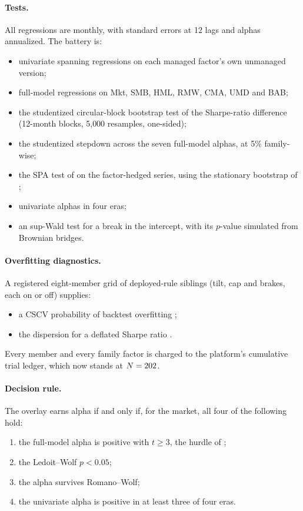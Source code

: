 \documentclass[11pt]{article}
\begin{document}
\paragraph{Tests.} All regressions are monthly, with \citet{newey1987}
standard errors at 12 lags and alphas annualized. The battery is:
\begin{itemize}
\item univariate spanning regressions on each managed factor's own unmanaged
  version;
\item full-model regressions on Mkt, SMB, HML, RMW, CMA, UMD and BAB;
\item the \citet{ledoit2008} studentized circular-block bootstrap test of the
  Sharpe-ratio difference (12-month blocks, 5{,}000 resamples, one-sided);
\item the \citet{romano2005} studentized stepdown across the seven
  full-model alphas, at 5\% family-wise;
\item the SPA test of \citet{hansen2005} on the factor-hedged series, using the
  stationary bootstrap of \citet{politis1994};
\item univariate alphas in four eras;
\item an \citet{andrews1993} sup-Wald test for a break in the intercept,
  with its $p$-value simulated from Brownian bridges.
\end{itemize}

\paragraph{Overfitting diagnostics.} A registered eight-member grid of
deployed-rule siblings (tilt, cap and brakes, each on or off) supplies:
\begin{itemize}
\item a CSCV probability of backtest overfitting \citep{bailey2017};
\item the dispersion for a deflated Sharpe ratio \citep{bailey2014}.
\end{itemize}
Every member and every family factor is charged to the platform's
cumulative trial ledger, which now stands at $N=202$.

\paragraph{Decision rule.} The overlay earns alpha if and only if, for the
market, all four of the following hold:
\begin{enumerate}
\item the full-model alpha is positive with $t\ge3$, the hurdle of
  \citet{harvey2016};
\item the Ledoit--Wolf $p<0.05$;
\item the alpha survives Romano--Wolf;
\item the univariate alpha is positive in at least three of four eras.
\end{enumerate}
\end{document}
